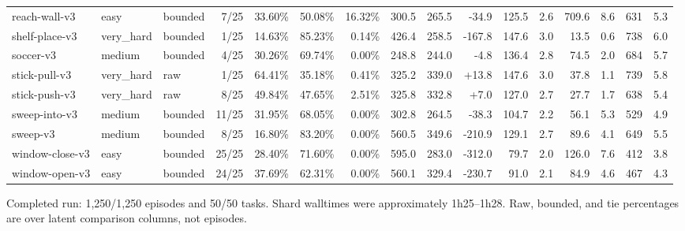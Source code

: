 \begin{landscape}
\begin{longtable}{@{}l l l r r r r r r r r r r r r r@{}}
reach-wall-v3 & easy & bounded & 7/25 & 33.60\% & 50.08\% & 16.32\% & 300.5 & 265.5 & -34.9 & 125.5 & 2.6 & 709.6 & 8.6 & 631 & 5.3 \\
shelf-place-v3 & very\_hard & bounded & 1/25 & 14.63\% & 85.23\% & 0.14\% & 426.4 & 258.5 & -167.8 & 147.6 & 3.0 & 13.5 & 0.6 & 738 & 6.0 \\
soccer-v3 & medium & bounded & 4/25 & 30.26\% & 69.74\% & 0.00\% & 248.8 & 244.0 & -4.8 & 136.4 & 2.8 & 74.5 & 2.0 & 684 & 5.7 \\
stick-pull-v3 & very\_hard & raw & 1/25 & 64.41\% & 35.18\% & 0.41\% & 325.2 & 339.0 & +13.8 & 147.6 & 3.0 & 37.8 & 1.1 & 739 & 5.8 \\
stick-push-v3 & very\_hard & raw & 8/25 & 49.84\% & 47.65\% & 2.51\% & 325.8 & 332.8 & +7.0 & 127.0 & 2.7 & 27.7 & 1.7 & 638 & 5.4 \\
sweep-into-v3 & medium & bounded & 11/25 & 31.95\% & 68.05\% & 0.00\% & 302.8 & 264.5 & -38.3 & 104.7 & 2.2 & 56.1 & 5.3 & 529 & 4.9 \\
sweep-v3 & medium & bounded & 8/25 & 16.80\% & 83.20\% & 0.00\% & 560.5 & 349.6 & -210.9 & 129.1 & 2.7 & 89.6 & 4.1 & 649 & 5.5 \\
window-close-v3 & easy & bounded & 25/25 & 28.40\% & 71.60\% & 0.00\% & 595.0 & 283.0 & -312.0 & 79.7 & 2.0 & 126.0 & 7.6 & 412 & 3.8 \\
window-open-v3 & easy & bounded & 24/25 & 37.69\% & 62.31\% & 0.00\% & 560.1 & 329.4 & -230.7 & 91.0 & 2.1 & 84.9 & 4.6 & 467 & 4.3 \\
\bottomrule
\end{longtable}
\normalsize
\end{landscape}


Completed run: 1,250/1,250 episodes and 50/50 tasks. Shard walltimes were approximately 1h25--1h28. Raw, bounded, and tie percentages are over latent comparison columns, not episodes.
